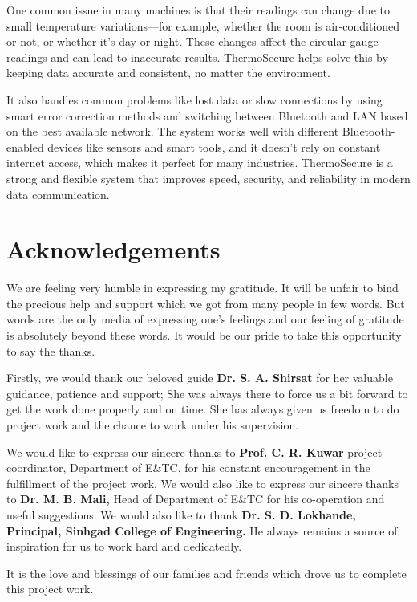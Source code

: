 \documentclass[12pt]{report}
\begin{document}
One common issue in many machines is that their readings can change due to small temperature variations—for example, whether the room is air-conditioned or not, or whether it's day or night. These changes affect the circular gauge readings and can lead to inaccurate results. ThermoSecure helps solve this by keeping data accurate and consistent, no matter the environment.

It also handles common problems like lost data or slow connections by using smart error correction methods and switching between Bluetooth and LAN based on the best available network. The system works well with different Bluetooth-enabled devices like sensors and smart tools, and it doesn't rely on constant internet access, which makes it perfect for many industries. ThermoSecure is a strong and flexible system that improves speed, security, and reliability in modern data communication.
\newpage

\chapter*{Acknowledgements}
We are feeling very humble in expressing my gratitude. It will be unfair to bind the precious help and support which we got from many people in few words. But words are the only media of expressing one's feelings and our feeling of gratitude is absolutely beyond these words. It would be our pride to take this opportunity to say the thanks.

Firstly, we would thank our beloved guide \textbf{Dr. S. A. Shirsat} for her valuable guidance, patience and support; She was always there to force us a bit forward to get the work done properly and on time. She has always given us freedom to do project work and the chance to work under his supervision.

We would like to express our sincere thanks to \textbf{Prof. C. R. Kuwar} project coordinator, Department of E\&TC, for his constant encouragement in the fulfillment of the project work. We would also like to express our sincere thanks to \textbf{Dr. M. B. Mali,} Head of Department of E\&TC for his co-operation and useful suggestions. We would also like to thank \textbf{Dr. S. D. Lokhande, Principal, Sinhgad College of Engineering.} He always remains a source of inspiration for us to work hard and dedicatedly.

It is the love and blessings of our families and friends which drove us to complete this project work.
\end{document}
